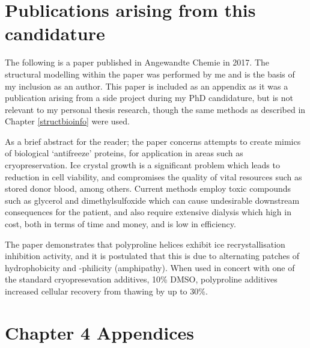 \documentclass[a4paper, oneside, 11pt]{report} %
\begin{document}
\begin{appendices}
\chapter{Publications arising from this candidature}\label{publications}
The following is a paper published in Angewandte Chemie in 2017. The structural modelling within the paper was performed by me and is the basis of my inclusion as an author. This paper is included as an appendix as it was a publication arising from a side project during my PhD candidature, but is not relevant to my personal thesis research, though the same methods as described in Chapter \ref{structbioinfo} were used.

As a brief abstract for the reader; the paper concerns attempts to create mimics of biological `antifreeze' proteins, for application in areas such as cryopreservation. Ice crystal growth is a significant problem which leads to reduction in cell viability, and compromises the quality of vital resources such as stored donor blood, among others. Current methods employ toxic compounds such as glycerol and dimethylsulfoxide which can cause undesirable downstream consequences for the patient, and also require extensive dialysis which high in cost, both in terms of time and money, and is low in efficiency.

The paper demonstrates that polyproline helices exhibit ice recrystallisation inhibition activity, and it is postulated that this is due to alternating patches of hydrophobicity and -philicity (amphipathy). When used in concert with one of the standard cryopresevation additives, 10\% DMSO, polyproline additives increased cellular recovery from thawing by up to 30\%.




%


\chapter{Chapter 4 Appendices}\label{bioinformatics_appendix}


\end{appendices}

\clearpage
\end{document}
